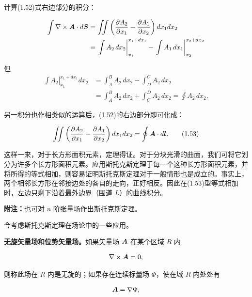 计算(1.52)式右边部分的积分：

\begin{equation*}
\begin{aligned}
\int \nabla \times \bm{A} \cdot d\bm{S}
&= \iint \left(\frac{\partial A_2}{\partial x_1} - \frac{\partial A_1}{\partial x_2}\right) dx_1 dx_2\\
&= \left.\int A_2\, dx_2\right|_{x_1}^{x_1 + dx_1} - \left.\int A_1\, dx_1\right|_{x_2}^{x_2 + dx_2}
\end{aligned}
\end{equation*}

但
\begin{equation*}
\begin{aligned}
\left.\int A_2\right|_{x_1}^{x_1 + dx_1} dx_2 &= \int_{A}^{B} A_2\, dx_2 - \int_{D}^{C} A_2\, dx_2\\
&= \int_{A}^{B} A_2\, dx_2 + \int_{C}^{D} A_2\, dx_2 = \oint A_2\, dx_2.
\end{aligned}
\end{equation*}

另一积分也作相类似的运算后，(1.52)的右边部分即可化成：

\begin{equation}
\iint \left(\frac{\partial A_2}{\partial x_1} - \frac{\partial A_1}{\partial x_2}\right) dx_1 dx_2 = \oint \bm{A} \cdot d\bm{l}.
\tag{1.53}
\end{equation}

这样一来，对于长方形面积元素，定理得证。对于分块光滑的曲面，我们可将它划分为许多个长方形面积元素。应用斯托克斯定理于每一个这种长方形面积元素，并将所得的等式相加，则容易证明斯托克斯定理对于一般情形也是成立的。事实上，两个相邻长方形在邻接边处的各自的走向，正好相反。因此在(1.53)型等式相加时，左边只剩下沿着最外边界（围道 $L$）的曲线积分。

\textbf{附注：}也可对 $n$ 阶张量场作出斯托克斯定理。

今考虑斯托克斯定理在场论中的一些应用。

\textbf{无旋矢量场和位势矢量场。}如果矢量场 $\bm{A}$ 在某个区域 $R$ 内

\begin{equation*}
\nabla \times \bm{A} = 0,
\end{equation*}

则称此场在 $R$ 内是无旋的；如果存在连续标量场 $\Phi$，使在域 $R$ 内处处有

\begin{equation*}
\bm{A} = \nabla\Phi,
\end{equation*}

